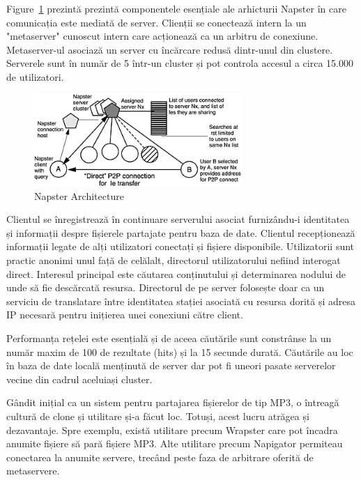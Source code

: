 Figure~\ref{fig:p2p-systems:napster} prezintă prezintă componentele esențiale
ale arhicturii Napster în care comunicația este mediată de server. Clienții se
conectează intern la un "metaserver" cunoscut intern care acționează ca un
arbitru de conexiune. Metaserver-ul asociază un server cu încărcare redusă
dintr-unul din clustere. Serverele sunt în număr de 5 într-un cluster și pot
controla accesul a circa 15.000 de utilizatori.

\begin{figure}
  \centering
  \includegraphics[width=0.7\textwidth]{src/img/p2p-systems/napster}
  \caption{Napster Architecture}
  \label{fig:p2p-systems:napster}
\end{figure}

Clientul se înregistrează în continuare serverului asociat furnizându-i
identitatea și informații despre fișierele partajate pentru baza de date.
Clientul recepționează informații legate de alți utilizatori conectați și
fișiere disponibile. Utilizatorii sunt practic anonimi unul față de celălalt,
directorul utilizatorului nefiind interogat direct. Interesul principal este
căutarea conținutului și determinarea nodului de unde să fie descărcată
resursa. Directorul de pe server folosește doar ca un serviciu de translatare
între identitatea stației asociată cu resursa dorită și adresa IP necesară
pentru inițierea unei conexiuni către client.

Performanța rețelei este esențială și de aceea căutările sunt constrânse la un
număr maxim de 100 de rezultate (hits) și la 15 secunde durată. Căutările au
loc în baza de date locală menținută de server dar pot fi uneori pasate
serverelor vecine din cadrul aceluiași cluster.

Gândit inițial ca un sistem pentru partajarea fișierelor de tip MP3, o
întreagă cultură de clone și utilitare și-a făcut loc. Totuși, acest lucru
atrăgea și dezavantaje. Spre exemplu, există utilitare precum Wrapster care
pot încadra anumite fișiere să pară fișiere MP3. Alte utilitare precum
Napigator permiteau conectarea la anumite servere, trecând peste faza de
arbitrare oferită de metaservere.

